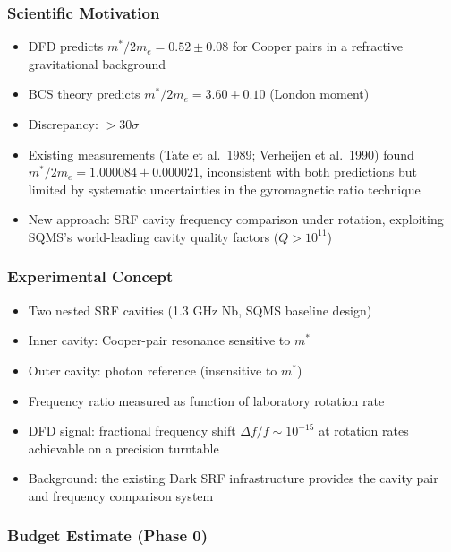 \documentclass[11pt,a4paper]{article}
\begin{document}
\subsubsection{Scientific Motivation}
\begin{itemize}
\item DFD predicts $m^*/2m_e = 0.52 \pm 0.08$ for Cooper pairs in a refractive gravitational background
\item BCS theory predicts $m^*/2m_e = 3.60 \pm 0.10$ (London moment)
\item Discrepancy: $>30\sigma$
\item Existing measurements (Tate et al.\ 1989; Verheijen et al.\ 1990) found $m^*/2m_e = 1.000084 \pm 0.000021$, inconsistent with both predictions but limited by systematic uncertainties in the gyromagnetic ratio technique
\item New approach: SRF cavity frequency comparison under rotation, exploiting SQMS's world-leading cavity quality factors ($Q > 10^{11}$)
\end{itemize}

\subsubsection{Experimental Concept}
\begin{itemize}
\item Two nested SRF cavities (1.3 GHz Nb, SQMS baseline design)
\item Inner cavity: Cooper-pair resonance sensitive to $m^*$
\item Outer cavity: photon reference (insensitive to $m^*$)
\item Frequency ratio measured as function of laboratory rotation rate
\item DFD signal: fractional frequency shift $\Delta f / f \sim 10^{-15}$ at rotation rates achievable on a precision turntable
\item Background: the existing Dark SRF infrastructure provides the cavity pair and frequency comparison system
\end{itemize}

\subsubsection{Budget Estimate (Phase 0)}
\end{document}
